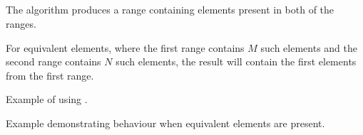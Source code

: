 \subsection{\texorpdfstring{}{\texttt{std::set\_intersection}}}

The  algorithm produces a range containing elements present in both of the ranges.


For equivalent elements, where the first range contains $M$ such elements and the second range contains $N$ such elements, the result will contain the first  elements from the first range.

\begin{box-note}
\footnotesize Example of using .
\tcblower
{}
\end{box-note}

\begin{box-note}
\footnotesize Example demonstrating  behaviour when equivalent elements are present.
\tcblower
{}
\end{box-note}